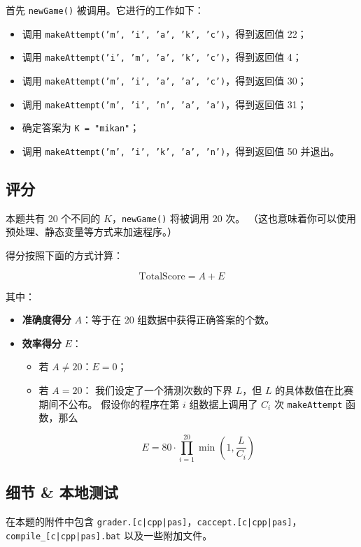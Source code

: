\documentclass[UTF8, 11pt, a4paper]{article}
\begin{document}
首先 \texttt{newGame()} 被调用。它进行的工作如下：
\begin{itemize}
    \item 调用 \texttt{makeAttempt('m', 'i', 'a', 'k', 'c')}，得到返回值 22；
    \item 调用 \texttt{makeAttempt('i', 'm', 'a', 'k', 'c')}，得到返回值 4；
    \item 调用 \texttt{makeAttempt('m', 'i', 'a', 'a', 'c')}，得到返回值 30；
    \item 调用 \texttt{makeAttempt('m', 'i', 'n', 'a', 'a')}，得到返回值 31；
    \item 确定答案为 \texttt{K = "mikan"}；
    \item 调用 \texttt{makeAttempt('m', 'i', 'k', 'a', 'n')}，得到返回值 50 并退出。
\end{itemize}

\subsection*{评分}
本题共有 20 个不同的 $K$，\texttt{newGame()} 将被调用 20 次。%
（这也意味着你可以使用预处理、静态变量等方式来加速程序。）

得分按照下面的方式计算：

$$
    \mathrm{TotalScore} = A + E
$$

其中：
\begin{itemize}
    \item \textbf{准确度得分} $A$：等于在 20 组数据中获得正确答案的个数。
    \item \textbf{效率得分} $E$：
    \begin{itemize}
        \item 若 $A \neq 20$：$E = 0$；
        \item 若 $A = 20$：
            我们设定了一个猜测次数的下界 $L$，但 $L$ 的具体数值在比赛期间不公布。
            假设你的程序在第 $i$ 组数据上调用了 $C_i$ 次 \texttt{makeAttempt} 函数，那么

            $$
                E = 80 \cdot \prod_{i = 1}^{20} \min\left(1, \frac{L}{C_i}\right)
            $$
    \end{itemize}
\end{itemize}

\subsection*{细节 \& 本地测试}
在本题的附件中包含 \texttt{grader.[c|cpp|pas]}，\texttt{caccept.[c|cpp|pas]}，%
\texttt{compile\_[c|cpp|pas].bat} 以及一些附加文件。
\end{document}
